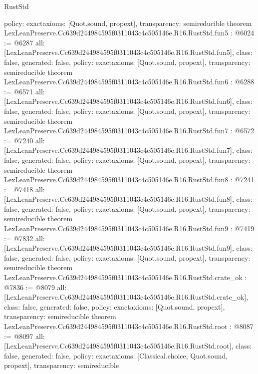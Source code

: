 \begin{lexlean}{RustStd}
\begin{coremodule}
{  policy: exact{axioms: [Quot.sound, propext]},
  transparency: semireducible
}
theorem LexLeanPreserve.Cc639d244984595f0311043c4c505146e.R16.RustStd.fun5 : @6024 := @6287 {
  all: [LexLeanPreserve.Cc639d244984595f0311043c4c505146e.R16.RustStd.fun5],
  class: false,
  generated: false,
  policy: exact{axioms: [Quot.sound, propext]},
  transparency: semireducible
}
theorem LexLeanPreserve.Cc639d244984595f0311043c4c505146e.R16.RustStd.fun6 : @6288 := @6571 {
  all: [LexLeanPreserve.Cc639d244984595f0311043c4c505146e.R16.RustStd.fun6],
  class: false,
  generated: false,
  policy: exact{axioms: [Quot.sound, propext]},
  transparency: semireducible
}
theorem LexLeanPreserve.Cc639d244984595f0311043c4c505146e.R16.RustStd.fun7 : @6572 := @7240 {
  all: [LexLeanPreserve.Cc639d244984595f0311043c4c505146e.R16.RustStd.fun7],
  class: false,
  generated: false,
  policy: exact{axioms: [Quot.sound, propext]},
  transparency: semireducible
}
theorem LexLeanPreserve.Cc639d244984595f0311043c4c505146e.R16.RustStd.fun8 : @7241 := @7418 {
  all: [LexLeanPreserve.Cc639d244984595f0311043c4c505146e.R16.RustStd.fun8],
  class: false,
  generated: false,
  policy: exact{axioms: [Quot.sound, propext]},
  transparency: semireducible
}
theorem LexLeanPreserve.Cc639d244984595f0311043c4c505146e.R16.RustStd.fun9 : @7419 := @7832 {
  all: [LexLeanPreserve.Cc639d244984595f0311043c4c505146e.R16.RustStd.fun9],
  class: false,
  generated: false,
  policy: exact{axioms: [Quot.sound, propext]},
  transparency: semireducible
}
theorem LexLeanPreserve.Cc639d244984595f0311043c4c505146e.R16.RustStd.crate_ok : @7836 := @8079 {
  all: [LexLeanPreserve.Cc639d244984595f0311043c4c505146e.R16.RustStd.crate_ok],
  class: false,
  generated: false,
  policy: exact{axioms: [Quot.sound, propext]},
  transparency: semireducible
}
theorem LexLeanPreserve.Cc639d244984595f0311043c4c505146e.R16.RustStd.root : @8087 := @8097 {
  all: [LexLeanPreserve.Cc639d244984595f0311043c4c505146e.R16.RustStd.root],
  class: false,
  generated: false,
  policy: exact{axioms: [Classical.choice, Quot.sound, propext]},
  transparency: semireducible
}


\end{coremodule}
\end{lexlean}
